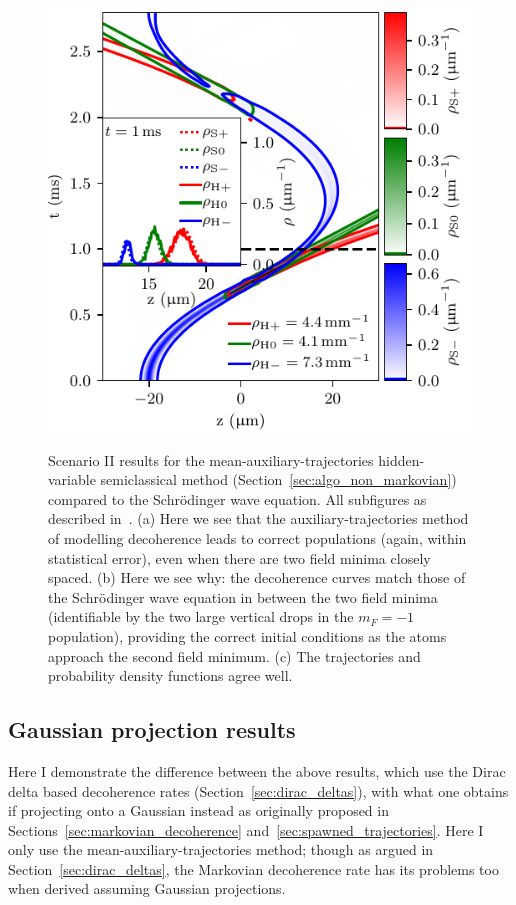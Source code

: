 {\begin{figure}
{    \includegraphics{figures/hidden_variables/hvsc_aux_mirror/trajectories.pdf}
    }
    \caption{Scenario II results for the mean-auxiliary-trajectories hidden-variable semiclassical method (Section~\ref{sec:algo_non_markovian}) compared to the Schr\"odinger wave equation. All subfigures as described in~. (a) Here we see that the auxiliary-trajectories method of modelling decoherence leads to correct populations (again, within statistical error), even when there are two field minima closely spaced. (b) Here we see why: the decoherence curves match those of the Schr\"odinger wave equation in between the two field minima (identifiable by the two large vertical drops in the $m_F=-1$ population), providing the correct initial conditions as the atoms approach the second field minimum. (c) The trajectories and probability density functions agree well.}\label{fig:scenario_two_aux}
\end{figure}
\restoregeometry}


\subsection{Gaussian projection results}

Here I demonstrate the difference between the above results, which use the Dirac delta based decoherence rates (Section~\ref{sec:dirac_deltas}), with what one obtains if projecting onto a Gaussian instead as originally proposed in Sections~\ref{sec:markovian_decoherence} and~\ref{sec:spawned_trajectories}. Here I only use the mean-auxiliary-trajectories method; though as argued in Section~\ref{sec:dirac_deltas}, the Markovian decoherence rate has its problems too when derived assuming Gaussian projections.

